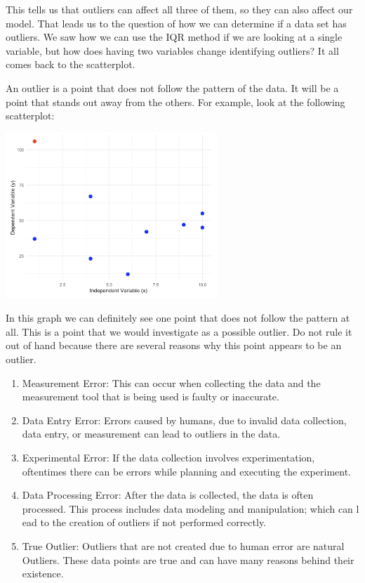 \documentclass[
  letterpaper,
  DIV=11,
  numbers=noendperiod]{scrreprt}
\begin{document}
This tells us that outliers can affect all three of them, so they can
also affect our model. That leads us to the question of how we can
determine if a data set has outliers. We saw how we can use the IQR
method if we are looking at a single variable, but how does having two
variables change identifying outliers? It all comes back to the
scatterplot.

An outlier is a point that does not follow the pattern of the data. It
will be a point that stands out away from the others. For example, look
at the following scatterplot:

\includegraphics[width=0.6\textwidth,height=\textheight]{./images/ROP_3.jpg}

In this graph we can definitely see one point that does not follow the
pattern at all. This is a point that we would investigate as a possible
outlier. Do not rule it out of hand because there are several reasons
why this point appears to be an outlier.

\begin{enumerate}
\def\labelenumi{\arabic{enumi}.}
\item
  Measurement Error: This can occur when collecting the data and the
  measurement tool that is being used is faulty or inaccurate.
\item
  Data Entry Error: Errors caused by humans, due to invalid data
  collection, data entry, or measurement can lead to outliers in the
  data.
\item
  Experimental Error: If the data collection involves experimentation,
  oftentimes there can be errors while planning and executing the
  experiment.
\item
  Data Processing Error: After the data is collected, the data is often
  processed. This process includes data modeling and manipulation; which
  can l ead to the creation of outliers if not performed correctly.
\item
  True Outlier: Outliers that are not created due to human error are
  natural Outliers. These data points are true and can have many reasons
  behind their existence.
\end{enumerate}
\end{document}
